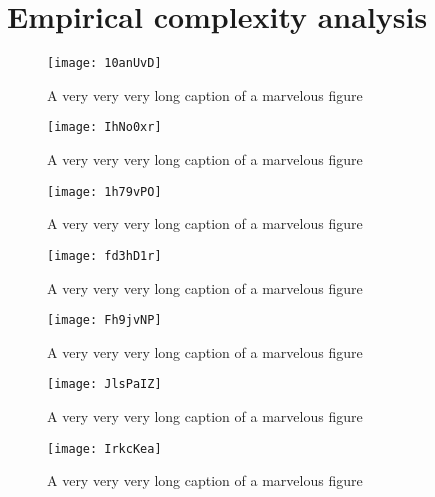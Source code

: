 \chapter{Empirical complexity analysis} \label{empirical}

\begin{figure}[H]
    \centering
    \texttt{[image: 10anUvD]}
    \caption[Short caption, for list of figures]{A very very very long caption of a marvelous figure}
\end{figure}

\begin{figure}[H]
    \centering
    \texttt{[image: IhNo0xr]}
    \caption[Short caption, for list of figures]{A very very very long caption of a marvelous figure}
\end{figure}

\begin{figure}[H]
    \centering
    \texttt{[image: 1h79vPO]}
    \caption[Short caption, for list of figures]{A very very very long caption of a marvelous figure}
\end{figure}

\begin{figure}[H]
    \centering
    \texttt{[image: fd3hD1r]}
    \caption[Short caption, for list of figures]{A very very very long caption of a marvelous figure}
\end{figure}

\begin{figure}[H]
    \centering
    \texttt{[image: Fh9jvNP]}
    \caption[Short caption, for list of figures]{A very very very long caption of a marvelous figure}
\end{figure}

\begin{figure}[H]
    \centering
    \texttt{[image: JlsPaIZ]}
    \caption[Short caption, for list of figures]{A very very very long caption of a marvelous figure}
\end{figure}

\begin{figure}[H]
    \centering
    \texttt{[image: IrkcKea]}
    \caption[Short caption, for list of figures]{A very very very long caption of a marvelous figure}
\end{figure}

